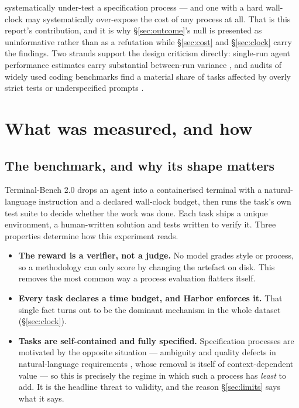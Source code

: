 \documentclass[11pt,a4paper]{article}
\begin{document}
\begin{enumerate}[label=\textbf{\Alph*.},leftmargin=2.1em]
{      systematically under-test a specification process --- and one with a hard wall-clock may
      systematically over-expose the cost of any process at all.} That is this report's
      contribution, and it is why \S\ref{sec:outcome}'s null is presented as uninformative
      rather than as a refutation while \S\ref{sec:cost} and \S\ref{sec:clock} carry the
      findings. Two strands support the design criticism directly: single-run agent
      performance estimates carry substantial between-run variance
      \citep{bjarnason2026randomness}, and audits of widely used coding benchmarks find a
      material share of tasks affected by overly strict tests or underspecified prompts
      \citep{openai2026signal}.
\end{enumerate}

\clearpage
\section{What was measured, and how}

\subsection{The benchmark, and why its shape matters}

Terminal-Bench 2.0 \citep{merrill2026terminalbench} drops an agent into a containerised
terminal with a natural-language instruction and a declared wall-clock budget, then runs the
task's own test suite to decide whether the work was done. Each task ships a unique
environment, a human-written solution and tests written to verify it. Three properties determine how this experiment reads.

\begin{itemize}
\item \textbf{The reward is a verifier, not a judge.} No model grades style or process, so a
      methodology can only score by changing the artefact on disk. This removes the most
      common way a process evaluation flatters itself.
\item \textbf{Every task declares a time budget, and Harbor enforces it.} That single fact
      turns out to be the dominant mechanism in the whole dataset (\S\ref{sec:clock}).
\item \textbf{Tasks are self-contained and fully specified.} Specification processes are
      motivated by the opposite situation --- ambiguity and quality defects in
      natural-language requirements \citep{femmer2017smells}, whose removal is itself of
      context-dependent value \citep{ribeiro2020ambiguity} --- so this is precisely the regime
      in which such a process has \emph{least} to add. It is the headline threat to validity,
      and the reason \S\ref{sec:limits} says what it says.
\end{itemize}
\end{document}
